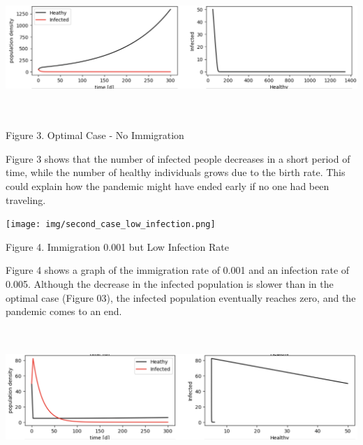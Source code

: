 \vspace{5mm}
\hspace{-6mm}\includegraphics[width=16cm, height=5.2cm]{img/optimal_case.png}

\vspace{3mm}
\hspace{37mm} Figure 3. Optimal Case - No Immigration

\vspace{3mm}
Figure 3 shows that the number of infected people decreases in a short period of time, while the number of healthy individuals grows due to the birth rate. This could explain how the pandemic might have ended early if no one had been traveling.

\vspace{5mm}
\hspace{-6mm}\texttt{[image: img/second\_case\_low\_infection.png]}

\vspace{5mm}
\hspace{37mm} Figure 4. Immigration 0.001 but Low Infection Rate
\vspace{5mm}

Figure 4 shows a graph of the immigration rate of 0.001 and an infection rate of 0.005. Although the decrease in the infected population is slower than in the optimal case (Figure 03), the infected population eventually reaches zero, and the pandemic comes to an end.


\hspace{-6mm}\includegraphics[width=16cm, height=5.2cm]{img/third_case_high_infection.png}


